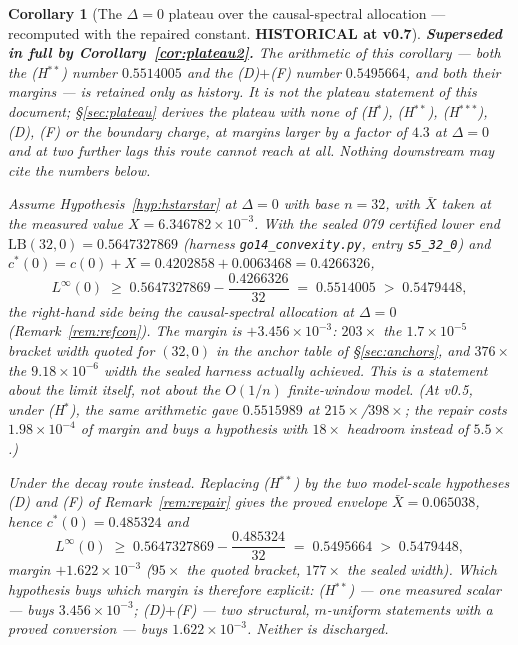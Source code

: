 \documentclass[11pt]{article}
\newtheorem{corollary}{Corollary}
\theoremstyle{definition}
\theoremstyle{remark}
\begin{document}
\begin{corollary}[The $\Delta=0$ plateau over the causal-spectral
allocation --- recomputed with the repaired constant.
\textbf{HISTORICAL at v0.7}]
\label{cor:plateau}
\textbf{Superseded in full by Corollary~\ref{cor:plateau2}.} The
arithmetic of this corollary --- both the (H$^{\ast\ast}$) number
$0.5514005$ and the (D)$+$(F) number $0.5495664$, and both their
margins --- is \emph{retained only as history}. It is not the
plateau statement of this document; \S\ref{sec:plateau} derives the
plateau with none of (H$^\ast$), (H$^{\ast\ast}$),
(H$^{\ast\ast\ast}$), (D), (F) or the boundary charge, at margins
larger by a factor of $4.3$ at $\Delta=0$ and at two further lags this
route cannot reach at all. Nothing downstream may cite the numbers
below.

Assume Hypothesis~\ref{hyp:hstarstar} at $\Delta=0$ with base $n=32$,
with $\bar X$ taken at the measured value $X=6.346782\times10^{-3}$.
With the sealed 079 certified lower end
$\mathrm{LB}(32,0)=0.5647327869$ (harness
\texttt{go14\_convexity.py}, entry \texttt{s5\_32\_0}) and
$c^\ast(0)=c(0)+X=0.4202858+0.0063468=0.4266326$,
\[
L^\infty(0)\;\ge\;0.5647327869-\frac{0.4266326}{32}
\;=\;0.5514005\;>\;0.5479448,
\]
the right-hand side being the causal-spectral allocation at $\Delta=0$
(Remark~\ref{rem:refcon}). The margin is $+3.456\times10^{-3}$:
$203\times$ the $1.7\times10^{-5}$ bracket width quoted for $(32,0)$ in
the anchor table of \S\ref{sec:anchors}, and $376\times$ the
$9.18\times10^{-6}$ width the sealed harness actually achieved.
\emph{This is a statement about the limit itself, not about the
$O(1/n)$ finite-window model.} (At v0.5, under (H$^\ast$), the same
arithmetic gave $0.5515989$ at $215\times$/$398\times$; the repair
costs $1.98\times10^{-4}$ of margin and buys a hypothesis with
$18\times$ headroom instead of $5.5\times$.)

\emph{Under the decay route instead.} Replacing (H$^{\ast\ast}$) by the
two model-scale hypotheses (D) and (F) of Remark~\ref{rem:repair} gives
the proved envelope $\bar X=0.065038$, hence $c^\ast(0)=0.485324$ and
\[
L^\infty(0)\;\ge\;0.5647327869-\frac{0.485324}{32}\;=\;0.5495664
\;>\;0.5479448 ,
\]
margin $+1.622\times10^{-3}$ ($95\times$ the quoted bracket,
$177\times$ the sealed width). Which hypothesis buys which margin is
therefore explicit: (H$^{\ast\ast}$) --- one measured scalar ---
buys $3.456\times10^{-3}$; (D)$+$(F) --- two structural, $m$-uniform
statements with a \emph{proved} conversion --- buys
$1.622\times10^{-3}$. Neither is discharged.


\end{corollary}
\end{document}
